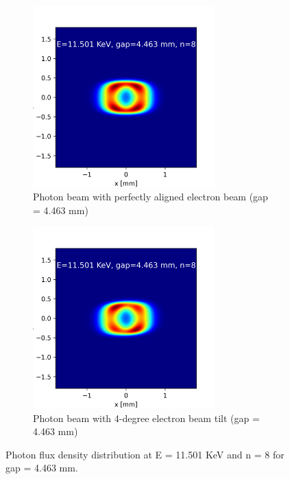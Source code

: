 \documentclass[a4paper,12pt]{article}
\begin{document}
\begin{figure}[H]
\centering
\begin{subfigure}{0.4\textwidth}
\includegraphics[width=1\linewidth, height=7cm]{photonbeam_right_E=11.501 KeV, gap=4.463 mm, n=8.png} 
\caption{Photon beam with perfectly aligned electron beam (gap = 4.463 mm)}
\end{subfigure}
\begin{subfigure}{0.4\textwidth}
\includegraphics[width=1\linewidth, height=7cm]{photonbeam_tilted_E=11.501 KeV, gap=4.463 mm, n=8.png}
\caption{Photon beam with 4-degree electron beam tilt (gap = 4.463 mm)}
\end{subfigure}
\caption{Photon flux density distribution at E = 11.501 KeV and n = 8 for gap = 4.463 mm.}
\label{fig:pt2}
\end{figure}
    
\end{document}
